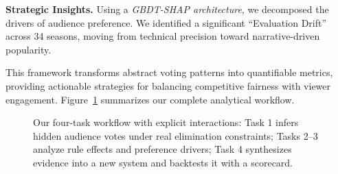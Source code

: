 \textbf{Strategic Insights.} Using a \textit{GBDT-SHAP architecture}, we decomposed the drivers of audience preference. We identified a significant ``Evaluation Drift'' across 34 seasons, moving from technical precision toward narrative-driven popularity.

This framework transforms abstract voting patterns into quantifiable metrics, providing actionable strategies for balancing competitive fairness with viewer engagement. Figure~\ref{fig:our-work-flow} summarizes our complete analytical workflow.

\begin{figure}[ht]
\centering
\resizebox{\linewidth}{!}{%
%
}
\caption{Our four-task workflow with explicit interactions: Task 1 infers hidden audience votes under real elimination constraints; Tasks 2--3 analyze rule effects and preference drivers; Task 4 synthesizes evidence into a new system and backtests it with a scorecard.}
\label{fig:our-work-flow}
\end{figure}



